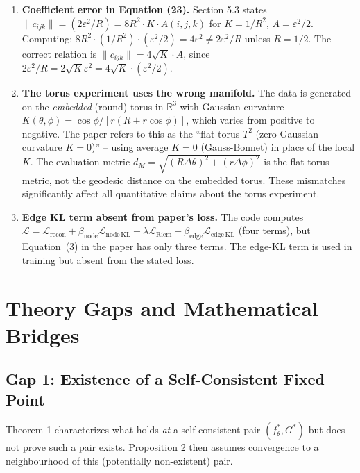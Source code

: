 \documentclass[11pt]{article}
\newcommand{\R}{\mathbb{R}}
\begin{document}
\begin{enumerate}
\item \textbf{Coefficient error in Equation (23).}
Section 5.3 states $\|c_{ijk}\| = (2\varepsilon^2/R) = 8R^2 \cdot K \cdot
A(i,j,k)$ for $K = 1/R^2$, $A = \varepsilon^2/2$. Computing: $8R^2 \cdot
(1/R^2) \cdot (\varepsilon^2/2) = 4\varepsilon^2 \neq 2\varepsilon^2/R$ unless
$R = 1/2$. The correct relation is $\|c_{ijk}\| = 4\sqrt{K} \cdot A$, since
$2\varepsilon^2/R = 2\sqrt{K} \varepsilon^2 = 4\sqrt{K} \cdot (\varepsilon^2/2)$.

\item \textbf{The torus experiment uses the wrong manifold.}
The data is generated on the \emph{embedded} (round) torus in $\R^3$ with
Gaussian curvature $K(\theta, \phi) = \cos\phi / [r(R + r\cos\phi)]$, which
varies from positive to negative. The paper refers to this as the ``flat torus
$T^2$ (zero Gaussian curvature $K=0$)'' -- using average $K = 0$ (Gauss-Bonnet)
in place of the local $K$. The evaluation metric $d_M = \sqrt{(R\Delta\theta)^2
+ (r\Delta\phi)^2}$ is the flat torus metric, not the geodesic distance on the
embedded torus. These mismatches significantly affect all quantitative claims
about the torus experiment.

\item \textbf{Edge KL term absent from paper's loss.}
The code computes $\mathcal{L} = \mathcal{L}_{\mathrm{recon}} + \beta_{\mathrm{node}}
\mathcal{L}_{\mathrm{node\,KL}} + \lambda \mathcal{L}_{\mathrm{Riem}}
+ \beta_{\mathrm{edge}} \mathcal{L}_{\mathrm{edge\,KL}}$ (four terms), but
Equation~(3) in the paper has only three terms. The edge-KL term is used
in training but absent from the stated loss.
\end{enumerate}

\section{Theory Gaps and Mathematical Bridges}

\subsection{Gap 1: Existence of a Self-Consistent Fixed Point}

\begin{gapbox}
Theorem 1 characterizes what holds \emph{at} a self-consistent pair
$(f_\theta^*, G^*)$ but does not prove such a pair exists. Proposition 2 then
assumes convergence to a neighbourhood of this (potentially non-existent) pair.
\end{gapbox}
\end{document}
